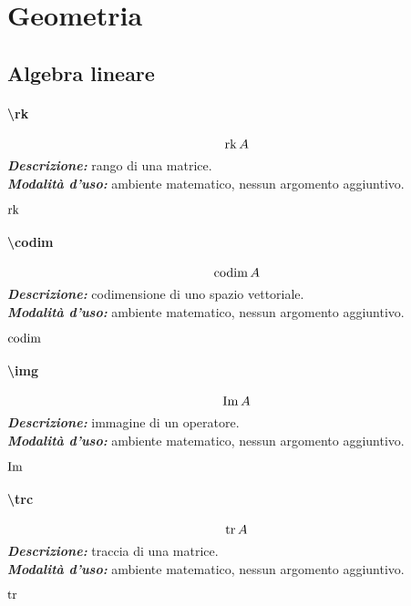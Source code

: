 \section{Geometria}
\subsection{Algebra lineare}
\paragraph{\textbackslash rk}
\begin{equation*}
	\operatorname{rk} A
\end{equation*}
\textbf{\textit{Descrizione:}} rango di una matrice.\\
\noindent\textbf{\textit{Modalità d'uso:}} ambiente matematico, nessun argomento aggiuntivo.\\
\begin{codelatex}
$\operatorname{rk}$
\end{codelatex}
\paragraph{\textbackslash codim}
\begin{equation*}
	\operatorname{codim} A
\end{equation*}
\textbf{\textit{Descrizione:}} codimensione di uno spazio vettoriale.\\
\noindent\textbf{\textit{Modalità d'uso:}} ambiente matematico, nessun argomento aggiuntivo.
\begin{codelatex}
$\operatorname{codim}$
\end{codelatex}
\paragraph{\textbackslash img}
\begin{equation*}
\operatorname{Im} A
\end{equation*}
\textbf{\textit{Descrizione:}} immagine di un operatore.\\
\noindent\textbf{\textit{Modalità d'uso:}} ambiente matematico, nessun argomento aggiuntivo.
\begin{codelatex}
$\operatorname{Im}$
\end{codelatex}
\paragraph{\textbackslash trc}
\begin{equation*}
	\operatorname{tr} A
\end{equation*}
\textbf{\textit{Descrizione:}} traccia di una matrice.\\
\noindent\textbf{\textit{Modalità d'uso:}} ambiente matematico, nessun argomento aggiuntivo.
\begin{codelatex}
$\operatorname{tr}$
\end{codelatex}
